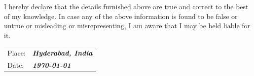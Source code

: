 \documentclass[a4paper]{article}
\begin{document}
\par I hereby declare that the details furnished above are true and correct to the best of my knowledge. In  case  any  of  the  above information is found to be false or untrue or misleading or misrepresenting, I am aware that I may be held 
liable 
for  it.\\
\begin{minipage}{0.5\textwidth}
 \begin{tabular}[h]{p{1 cm}@{\hskip 0.08in} @{\hskip 0.08in} l}
		Place: & \textbf{\textit{Hyderabad, India}} \\
		Date:  &  \textbf{\textit{\today}}\\
	\end{tabular}       
\end{minipage}
	\flushright
	\vspace{-5em}
\end{document}
